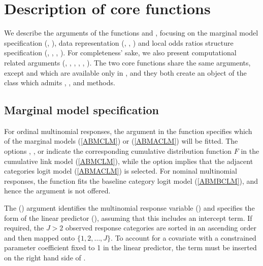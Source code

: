 \documentclass[article,shortnames,nojss]{jss}
\begin{document}
\section{Description of core functions}\label{Description1}
We describe the arguments of the functions  and , focusing on the marginal model specification (, ), data representation (, , ) and local odds ratios structure specification (, , , ). For completeness' sake, we also present computational related arguments (, , , , , ). The two core functions share the same arguments, except  and  which are available only in , and they both create an object of the class  which admits , ,  and  methods. 

\subsection{Marginal model specification}
For ordinal multinomial responses, the  argument in the function  specifies which of the marginal models (\ref{ABMCLM}) or (\ref{ABMACLM}) will be fitted. The options , ,  or  indicate the corresponding cumulative distribution function $F$ in the cumulative link model (\ref{ABMCLM}), while the option  implies that the adjacent categories logit model (\ref{ABMACLM}) is selected. For nominal multinomial responses, the function  fits the baseline category logit model (\ref{ABMBCLM}), and hence the  argument is not offered.

The  () argument identifies the multinomial response variable () and specifies the form of the linear predictor (), assuming that this includes an intercept term. If required, the $J>2$ observed response categories are sorted in an ascending order and then mapped onto $\{1,2,\ldots,J\}$. To account for a covariate  with a constrained parameter coefficient fixed to 1 in the linear predictor, the term  must be inserted on the right hand side of .
\end{document}

